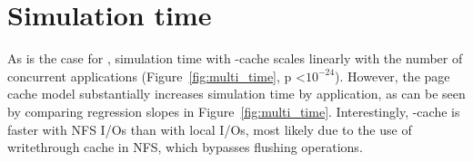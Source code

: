 \section{Simulation time}
As is the case for \wrench, simulation time with \wrench-cache scales
linearly with the number of concurrent applications
(Figure~\ref{fig:multi_time}, p \textless $10^{-24}$). However, the page
cache model substantially increases simulation time by
application, as can be seen by comparing regression slopes in
Figure~\ref{fig:multi_time}. Interestingly, \wrench-cache is faster with 
NFS I/Os than with local I/Os, most likely due to the use of writethrough
cache in NFS, which bypasses flushing operations.